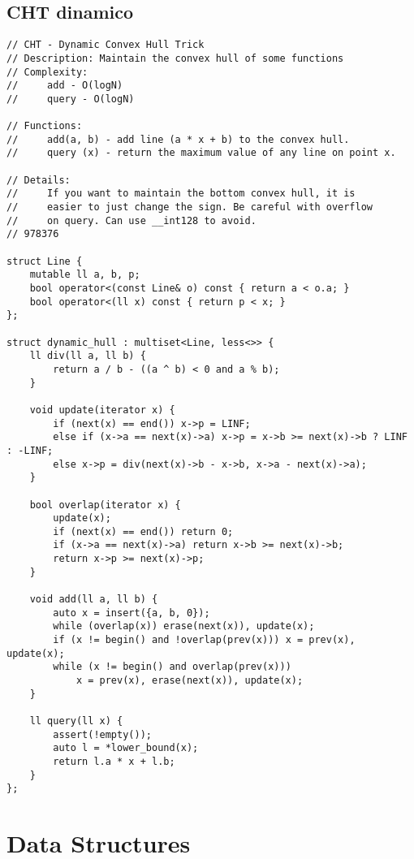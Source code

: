 \documentclass{article}
\begin{document}
\subsection{CHT dinamico}
\begin{verbatim}
// CHT - Dynamic Convex Hull Trick
// Description: Maintain the convex hull of some functions
// Complexity: 
//     add - O(logN)
//     query - O(logN)

// Functions:
//     add(a, b) - add line (a * x + b) to the convex hull.
//     query (x) - return the maximum value of any line on point x.

// Details:
//     If you want to maintain the bottom convex hull, it is
//     easier to just change the sign. Be careful with overflow
//     on query. Can use __int128 to avoid.
// 978376

struct Line {
    mutable ll a, b, p;
    bool operator<(const Line& o) const { return a < o.a; }
    bool operator<(ll x) const { return p < x; }
};

struct dynamic_hull : multiset<Line, less<>> {
    ll div(ll a, ll b) { 
        return a / b - ((a ^ b) < 0 and a % b);
    }
    
    void update(iterator x) {
        if (next(x) == end()) x->p = LINF;
        else if (x->a == next(x)->a) x->p = x->b >= next(x)->b ? LINF : -LINF;
        else x->p = div(next(x)->b - x->b, x->a - next(x)->a);
    }

    bool overlap(iterator x) {
        update(x);
        if (next(x) == end()) return 0;
        if (x->a == next(x)->a) return x->b >= next(x)->b;
        return x->p >= next(x)->p;
    }
        
    void add(ll a, ll b) {
        auto x = insert({a, b, 0});
        while (overlap(x)) erase(next(x)), update(x);
        if (x != begin() and !overlap(prev(x))) x = prev(x), update(x);
        while (x != begin() and overlap(prev(x))) 
            x = prev(x), erase(next(x)), update(x);
    }
    
    ll query(ll x) {
        assert(!empty());
        auto l = *lower_bound(x);
        return l.a * x + l.b;
    }
};\end{verbatim}
\section{Data Structures}
\end{document}
